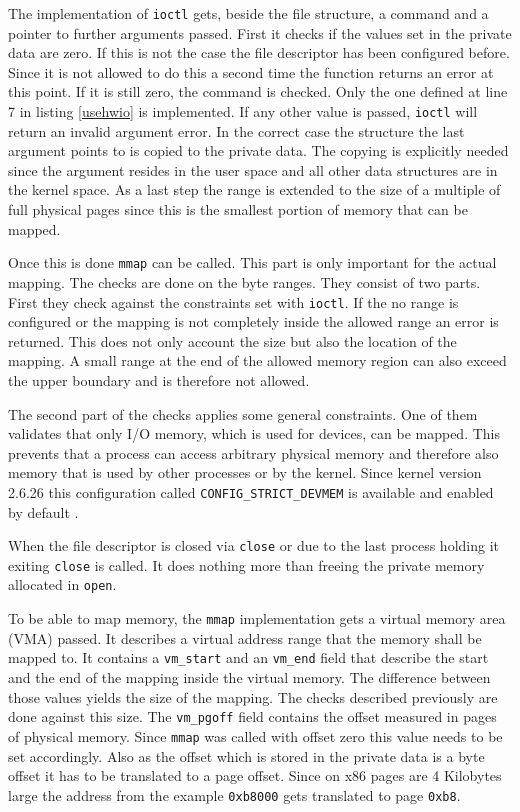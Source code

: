 \documentclass[
a4paper,
12pt,
notitlepage,
parskip=half,
DIV=11,
]{scrbook}
\begin{document}
		The implementation of \texttt{ioctl} gets, beside the file structure, a command and a pointer to further arguments passed.
		First it checks if the values set in the private data are zero.
		If this is not the case the file descriptor has been configured before.
		Since it is not allowed to do this a second time the function returns an error at this point.
		If it is still zero, the command is checked.
		Only the one defined at line 7 in listing \ref{usehwio} is implemented.
		If any other value is passed, \texttt{ioctl} will return an invalid argument error.
		In the correct case the structure the last argument points to is copied to the private data.
		The copying is explicitly needed since the argument resides in the user space and all other data structures are in the kernel space.
		As a last step the range is extended to the size of a multiple of full physical pages since this is the smallest portion of memory that can be mapped.
		
		Once this is done \texttt{mmap} can be called.
		This part is only important for the actual mapping.
		The checks are done on the byte ranges.
		They consist of two parts.
		First they check against the constraints set with \texttt{ioctl}.
		If the no range is configured or the mapping is not completely inside the allowed range an error is returned.
		This does not only account the size but also the location of the mapping.
		A small range at the end of the allowed memory region can also exceed the upper boundary and is therefore not allowed.
		
		The second part of the checks applies some general constraints.
		One of them validates that only I/O memory, which is used for devices, can be mapped.
		This prevents that a process can access arbitrary physical memory and therefore also memory that is used by other processes or by the kernel.
		Since kernel version 2.6.26 this configuration called \texttt{CONFIG\_STRICT\_DEVMEM} is available and enabled by default \citep{devmem}.
		
		When the file descriptor is closed via \texttt{close} or due to the last process holding it exiting \texttt{close} is called.
		It does nothing more than freeing the private memory allocated in \texttt{open}.
		
		To be able to map memory, the \texttt{mmap} implementation gets a virtual memory area (VMA) passed.
		It describes a virtual address range that the memory shall be mapped to.
		It contains a \texttt{vm\_start} and an \texttt{vm\_end} field that describe the start and the end of the mapping inside the virtual memory.
		The difference between those values yields the size of the mapping.
		The checks described previously are done against this size.
		The \texttt{vm\_pgoff} field contains the offset measured in pages of physical memory.
		Since \texttt{mmap} was called with offset zero this value needs to be set accordingly.
		Also as the offset which is stored in the private data is a byte offset it has to be translated to a page offset.
		Since on x86 pages are 4 Kilobytes large the address from the example \texttt{0xb8000} gets translated to page \texttt{0xb8}.
		
\end{document}
